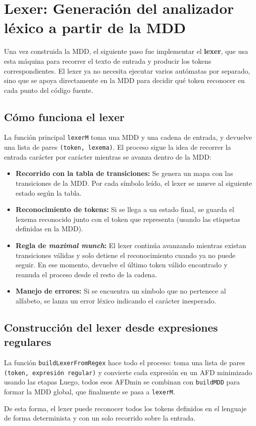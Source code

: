 \section{Lexer: Generación del analizador léxico a partir de la MDD}

Una vez construida la MDD, el siguiente paso fue implementar el \textbf{lexer}, que usa esta máquina para recorrer el texto de entrada y producir los tokens correspondientes.  
El lexer ya no necesita ejecutar varios autómatas por separado, sino que se apoya directamente en la MDD para decidir qué token reconocer en cada punto del código fuente.

\subsection*{Cómo funciona el lexer}
La función principal \texttt{lexerM} toma una MDD y una cadena de entrada, y devuelve una lista de pares \texttt{(token, lexema)}.  
El proceso sigue la idea de recorrer la entrada carácter por carácter mientras se avanza dentro de la MDD:
\begin{itemize}
  \item \textbf{Recorrido con la tabla de transiciones:} Se genera un mapa con las transiciones de la MDD. Por cada símbolo leído, el lexer se mueve al siguiente estado según la tabla.
  \item \textbf{Reconocimiento de tokens:} Si se llega a un estado final, se guarda el lexema reconocido junto con el token que representa (usando las etiquetas definidas en la MDD).
  \item \textbf{Regla de \textit{maximal munch}:} El lexer continúa avanzando mientras existan transiciones válidas y solo detiene el reconocimiento cuando ya no puede seguir.  
  En ese momento, devuelve el último token válido encontrado y reanuda el proceso desde el resto de la cadena.
  \item \textbf{Manejo de errores:} Si se encuentra un símbolo que no pertenece al alfabeto, se lanza un error léxico indicando el carácter inesperado.
\end{itemize}

\subsection*{Construcción del lexer desde expresiones regulares}
La función \texttt{buildLexerFromRegex} hace todo el proceso:  
toma una lista de pares \texttt{(token, expresión regular)} y convierte cada expresión en un AFD minimizado usando las etapas 
Luego, todos esos AFDmin se combinan con \texttt{buildMDD} para formar la MDD global, que finalmente se pasa a \texttt{lexerM}.

De esta forma, el lexer puede reconocer todos los tokens definidos en el lenguaje de forma determinista y con un solo recorrido sobre la entrada.
